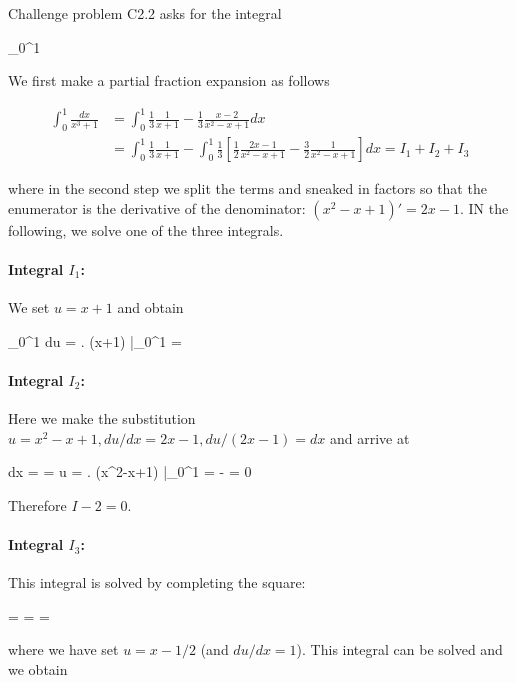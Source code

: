 
Challenge problem C2.2 asks for the integral

\bee
\int_0^1 
\eee

We first make a partial fraction expansion as follows

\begin{align*}
\int_0^1 \frac{dx}{x^3+1} &= \int_0^1 \frac{1}{3}\frac{1}{x+1} - \frac{1}{3}\frac{x-2}{x^2-x+1} dx \\ &= \int_0^1 \frac{1}{3}\frac{1}{x+1} - \int_0^1 \frac{1}{3} \left[ \frac{1}{2} \frac{2x-1}{x^2-x+1} - \frac{3}{2} \frac{1}{x^2-x+1} \right] dx = I_1 + I_2 + I_3
\end{align*}

where in the second step we split the terms and sneaked in factors so that the enumerator is the derivative of the denominator: $(x^2 - x+1)' = 2x-1$. IN the following, we solve one of the three integrals.

\paragraph{Integral $I_1$:} We set $u=x+1$ and obtain

\bee
\int_0^1  du =  \left. \ln (x+1) \right|_0^1 =  
\eee

\paragraph{Integral $I_2$:} Here we make the substitution $u = x^2-x+1, du/dx = 2x-1, du/(2x-1) = dx$ and arrive at

\bee
\int {} dx = \int {}  = \ln u = \left. \ln(x^2-x+1) \right|_0^1 =  -  = 0
\eee

Therefore $I-2 = 0$.

\paragraph{Integral $I_3$:} This integral is solved by completing the square:

\bee
\int {} = \int {} = \int {} = \int {}
\eee

where we have set $u=x-1/2$ (and $du/dx=1$). This integral can be solved and we obtain

